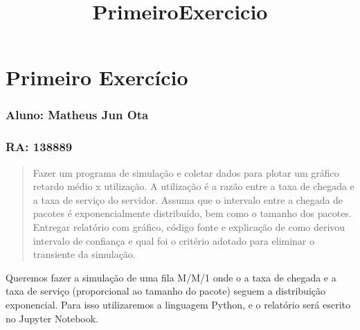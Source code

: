 \documentclass[11pt]{article}
\title{PrimeiroExercicio}
\begin{document}
    
    
    \maketitle
    
    

    
    \section{Primeiro Exercício}\label{primeiro-exercuxedcio}

\subsubsection{Aluno: Matheus Jun Ota}\label{aluno-matheus-jun-ota}

\subsubsection{RA: 138889}\label{ra-138889}

\begin{quote}
Fazer um programa de simulação e coletar dados para plotar um gráfico
retardo médio x utilização. A utilização é a razão entre a taxa de
chegada e a taxa de serviço do servidor. Assuma que o intervalo entre a
chegada de pacotes é exponencialmente distribuído, bem como o tamanho
dos pacotes. Entregar relatório com gráfico, código fonte e explicação
de como derivou intervalo de confiança e qual foi o critério adotado
para eliminar o transiente da simulação.
\end{quote}

Queremos fazer a simulação de uma fila M/M/1 onde o a taxa de chegada e
a taxa de serviço (proporcional ao tamanho do pacote) seguem a
distribuição exponencial. Para isso utilizaremos a linguagem Python, e o
relatório será escrito no Jupyter Notebook.
\end{document}

